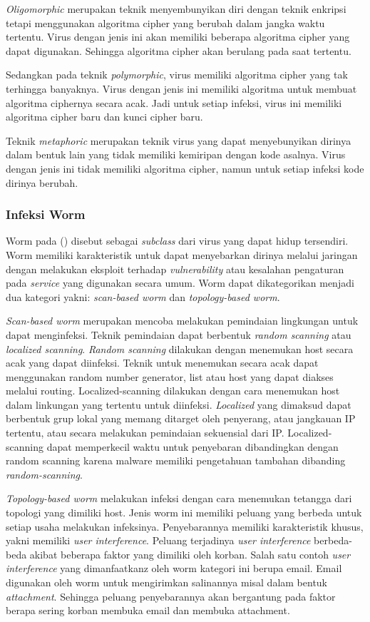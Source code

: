 \textit{Oligomorphic} merupakan teknik menyembunyikan diri dengan teknik enkripsi tetapi menggunakan algoritma cipher yang berubah dalam jangka waktu tertentu. Virus dengan jenis ini akan memiliki beberapa algoritma cipher yang dapat digunakan. Sehingga algoritma cipher akan berulang pada saat tertentu.

Sedangkan pada teknik \textit{polymorphic}, virus memiliki algoritma cipher yang tak terhingga banyaknya. Virus dengan jenis ini memiliki algoritma untuk membuat algoritma ciphernya secara acak. Jadi untuk setiap infeksi, virus ini memiliki algoritma cipher baru dan kunci cipher baru.

Teknik \textit{metaphoric} merupakan teknik virus yang dapat menyebunyikan dirinya dalam bentuk lain yang tidak memiliki kemiripan dengan kode asalnya. Virus dengan jenis ini tidak memiliki algoritma cipher, namun untuk setiap infeksi kode dirinya berubah.

\subsubsection{Infeksi Worm}

Worm pada (\cite{alsamer2016}) disebut sebagai \textit{subclass} dari virus yang dapat hidup tersendiri. Worm memiliki karakteristik untuk dapat menyebarkan dirinya melalui jaringan dengan melakukan eksploit terhadap \textit{vulnerability} atau kesalahan pengaturan pada \textit{service} yang digunakan secara umum. Worm dapat dikategorikan menjadi dua kategori yakni: \textit{scan-based worm} dan \textit{topology-based worm}.

\textit{Scan-based worm} merupakan mencoba melakukan pemindaian lingkungan untuk dapat menginfeksi. Teknik pemindaian dapat berbentuk \textit{random scanning} atau \textit{localized scanning}. \textit{Random scanning} dilakukan dengan menemukan host secara acak yang dapat diinfeksi. Teknik untuk menemukan secara acak dapat menggunakan random number generator, list atau host yang dapat diakses melalui routing. Localized-scanning dilakukan dengan cara menemukan host dalam linkungan yang tertentu untuk diinfeksi. \textit{Localized} yang dimaksud dapat berbentuk grup lokal yang memang ditarget oleh penyerang, atau jangkauan IP tertentu, atau secara melakukan pemindaian sekuensial dari IP. Localized-scanning dapat memperkecil waktu untuk penyebaran dibandingkan dengan random scanning karena malware memiliki pengetahuan tambahan dibanding \textit{random-scanning}.

\textit{Topology-based worm} melakukan infeksi dengan cara menemukan tetangga dari topologi yang dimiliki host. Jenis worm ini memiliki peluang yang berbeda untuk setiap usaha melakukan infeksinya. Penyebarannya memiliki karakteristik khusus, yakni memiliki \textit{user interference}. Peluang terjadinya \textit{user interference} berbeda-beda akibat beberapa faktor yang dimiliki oleh korban. Salah satu contoh \textit{user interference} yang dimanfaatkanz oleh worm kategori ini berupa email. Email digunakan oleh worm untuk mengirimkan salinannya misal dalam bentuk \textit{attachment}. Sehingga peluang penyebarannya akan bergantung pada faktor berapa sering korban membuka email dan membuka attachment.


